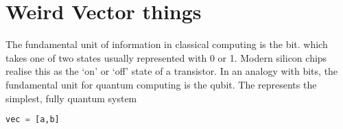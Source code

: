 \section{Weird Vector things}\label{TheBasics}
The fundamental unit of information in classical computing is the bit. which takes one of two states usually represented with 0 or 1. Modern silicon chips realise this as the `on' or `off' state of a transistor. In an analogy with bits, the fundamental unit for quantum computing is the qubit. The represents the simplest, fully quantum system 

\begin{lstlisting}[language=Python]
vec = [a,b]
\end{lstlisting}